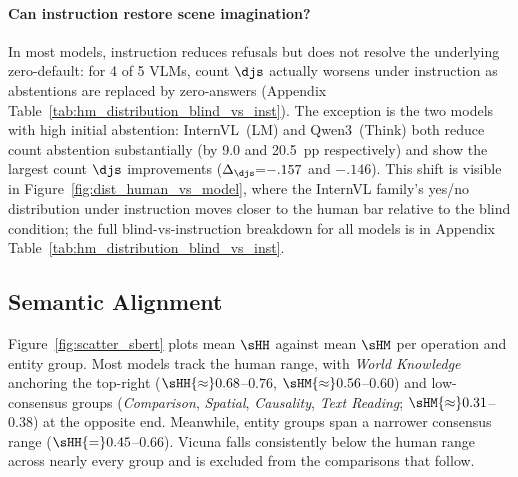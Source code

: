 \paragraph{Can instruction restore scene imagination?}
In most models, instruction reduces refusals but does not resolve the underlying zero-default: for 4 of 5 VLMs, count $\djs$ actually worsens under instruction as abstentions are replaced by zero-answers (Appendix Table~\ref{tab:hm_distribution_blind_vs_inst}).
The exception is the two models with high initial abstention: InternVL~(LM) and Qwen3~(Think) both reduce count abstention substantially (by 9.0 and 20.5~pp respectively) and show the largest count $\djs$ improvements ($\Delta_{\djs}{=}{-}.157$ and ${-}.146$).
This shift is visible in Figure~\ref{fig:dist_human_vs_model}, where the InternVL family's yes/no distribution under instruction moves closer to the human bar relative to the blind condition; the full blind-vs-instruction breakdown for all models is in Appendix Table~\ref{tab:hm_distribution_blind_vs_inst}. %

\subsection{Semantic Alignment}
\label{sec:alignment_main}

Figure~\ref{fig:scatter_sbert} plots mean $\sHH$ against mean $\sHM$ per operation and entity group.
Most models track the human range, with \textit{World Knowledge} anchoring the top-right ($\sHH{\approx}0.68$--$0.76$, $\sHM{\approx}0.56$--$0.60$) and low-consensus groups (\textit{Comparison}, \textit{Spatial}, \textit{Causality}, \textit{Text Reading}; $\sHM{\approx}0.31$--$0.38$) at the opposite end. %
Meanwhile, entity groups span a narrower consensus range ($\sHH{=}0.45$--$0.66$).%
Vicuna falls consistently below the human range across nearly every group and is excluded from the comparisons that follow.

